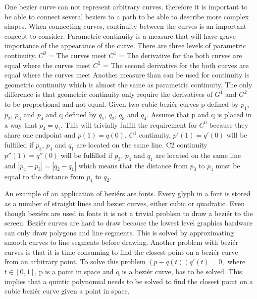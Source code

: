 One bezier curve can not represent arbitrary curves, therefore it is important to be able to connect several beziers to a path to be able to describe more complex shapes. When connecting curves, continuity between the curves is an important concept to consider. Parametric continuity is a measure that will have grave importance of the appearance of the curve. There are three levels of parametric continuity.\vspace{\baselineskip}\newline
\begin{math}C^0\end{math} = The curves meet\newline
\begin{math}C^1\end{math} = The derivative for the both curves are equal where the curves meet\newline
\begin{math}C^2\end{math} = The second derivative for the both curves are equal where the curves meet\vspace{\baselineskip} \newline
Another measure than can be used for continuity is geometric continuity which is almost the same as parametric continuity. The only difference is that geometric continuity only require the derivatives of $G^1$ and $G^2$ to be proportional and not equal. Given two cubic beziér curves p defined by $p_1$, $p_2$, $p_3$ and $p_4$ and q defined by $q_1$, $q_2$, $q_3$ and $q_4$. Assume that p and q is placed in a way that $p_4=q_1$. This will trivially fulfill the requirement for $C^0$ because they share one endpoint and $p(1)=q(0)$. $C^1$ continuity, $p'(1)=q'(0)$ will be fulfilled if $p_3$, $p_4$ and $q_1$ are located on the same line. C2 continuity $p''(1)=q''(0)$ will be fulfilled if  $p_3$, $p_4$ and $q_1$ are located on the same line and $|p_4 - p_3| = |q_2 - q_1|$ which means that the distance from $p_3$ to $p_4$ must be equal to the distance from $p_4$ to $q_2$.

An example of an application of beziérs are fonts. Every glyph in a font is stored as a number of straight lines and bezier curves, either cubic or quadratic.\citep{phinney2001} Even though beziérs are used in fonts it is not a trivial problem to draw a beziér to the screen. Beziér curves are hard to draw because the lowest level graphics hardware can only draw polygons and line segments. This is solved by approximating smooth curves to line segments before drawing\citep{shreiner2009opengl}. Another problem with beziér curves is that it is time consuming to find the closest point on a beziér curve from an arbitrary point. To solve this problem $(p-q(t))q'(t)=0,$ where $t\in[0, 1] $, p is a point in space and q is a beziér curve, has to be solved\citep{xiaodiao}. This implies that a quintic polynomial needs to be solved to find the closest point on a cubic beziér curve given a point in space. 

